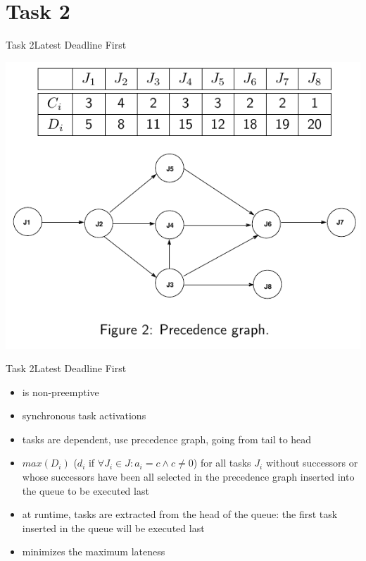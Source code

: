 
\section{Task 2}

\setcounter{task}{1}

\begin{frame}[shrink=10]{Task 2}{Latest Deadline First}
  \vspace{0.5cm}
  \begin{task}
    \centering
    \includegraphics[height=0.7\paperheight]{./figures/2_tab_graph.png}
  \end{task}
\end{frame}

\begin{frame}{Task 2}{Latest Deadline First}
  \begin{requirements}
    \begin{itemize}
      \item is \alert{non-preemptive}
      \item \alert{synchronous task activations}
      \item tasks are \alert{dependent}, use \alert{precedence graph}, going from \alert{tail} to \alert{head}
      \item $max(D_i)$ ($d_i$ if $\forall J_i\in J: a_i=c \wedge c\ne 0$) for all tasks $J_i$ \alert{without successors} or whose \alert{successors} have been all selected in the \alert{precedence graph} inserted into the queue to be \alert{executed last}
      \item at runtime, tasks are extracted from the \alert{head of the queue:} the \alert{first task} inserted in the queue will be \alert{executed last}
      \item \alert{minimizes} the \alert{maximum lateness}
    \end{itemize}
  \end{requirements}
\end{frame}

